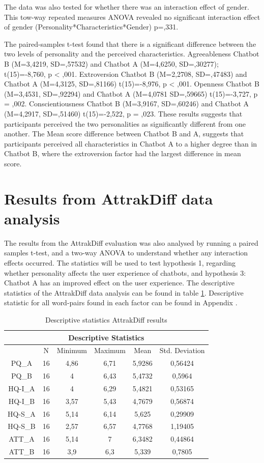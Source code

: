 The data was also tested for whether there was an interaction effect of gender. This tow-way repeated measures ANOVA revealed no significant interaction effect of gender (Personality*Characteristics*Gender) p=,331.

The paired-samples t-test found that there is a significant difference between the two levels of personality and the perceived characteristics. Agreeableness Chatbot B (M=3,4219, SD=,57532) and Chatbot A (M=4,6250, SD=,30277); t(15)=-8,760, p < ,001. Extroversion Chatbot B (M=2,2708, SD=,47483) and Chatbot A (M=4,3125, SD=,81166) t(15)=-8,976, p < ,001. Openness Chatbot B (M=3,4531, SD=,92294) and Chatbot A (M=4,0781 SD=,59665) t(15)=-3,727, p = ,002. Conscientiousness Chatbot B (M=3,9167, SD=,60246) and Chatbot A (M=4,2917, SD=,51460) t(15)=-2,522, p = ,023. These results suggests that participants perceived the two personalities as significantly different from one another. The Mean score difference between Chatbot B and A, suggests that participants perceived all characteristics in Chatbot A to a higher degree than in Chatbot B, where the extroversion factor had the largest difference in mean score.

\section{Results from AttrakDiff data analysis }
        
The results from the AttrakDiff evaluation was also analysed by running a paired samples t-test, and a two-way ANOVA to understand whether any interaction effects occurred. The statistics will be used to test hypothesis 1, regarding whether personality affects the user experience of chatbots, and hypothesis 3: Chatbot A has an improved effect on the user experience. The descriptive statistics of the AttrakDiff data analysis can be found in table \ref{table:6}. Descriptive statistic for all word-pairs found in each factor can be found in Appendix .

\begin{table}[h]
\centering
\begin{tabular}{cccccc}
\hline
\multicolumn{6}{c}{\textbf{Descriptive Statistics}} \\
\hline
& N & Minimum & Maximum & Mean & Std. Deviation \\
PQ_A & 16 & 4,86 & 6,71 & 5,9286 & 0,56424 \\
PQ_B & 16 & 4 & 6,43 & 5,4732 & 0,5964 \\
HQ-I_A & 16 & 4 & 6,29 & 5,4821 & 0,53165 \\
HQ-I_B & 16 & 3,57 & 5,43 & 4,7679 & 0,56874 \\
HQ-S_A & 16 & 5,14 & 6,14 & 5,625 & 0,29909 \\
HQ-S_B & 16 & 2,57 & 6,57 & 4,7768 & 1,19405 \\
ATT_A & 16 & 5,14 & 7 & 6,3482 & 0,44864 \\
ATT_B & 16 & 3,9 & 6,3 & 5,339 & 0,7805 \\
\end{tabular}
\caption{Descriptive statistics AttrakDiff results}
 \label{table:6}
    \end{table}

